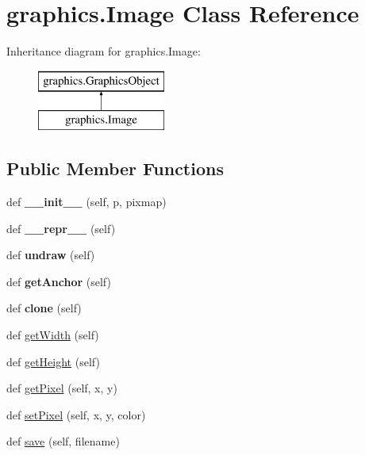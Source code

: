 \hypertarget{classgraphics_1_1_image}{}\section{graphics.\+Image Class Reference}
\label{classgraphics_1_1_image}
Inheritance diagram for graphics.\+Image\+:\begin{figure}[H]
\begin{center}
\leavevmode
\includegraphics[height=2.000000cm]{classgraphics_1_1_image}
\end{center}
\end{figure}
\subsection*{Public Member Functions}
\begin{DoxyCompactItemize}
\item 
def {\bfseries \+\_\+\+\_\+init\+\_\+\+\_\+} (self, p, pixmap)\hypertarget{classgraphics_1_1_image_a0e82c34ead99ecc7e8bd19f8d073c135}{}\label{classgraphics_1_1_image_a0e82c34ead99ecc7e8bd19f8d073c135}

\item 
def {\bfseries \+\_\+\+\_\+repr\+\_\+\+\_\+} (self)\hypertarget{classgraphics_1_1_image_a6dc7689939ebef91fbce7ff60b190a32}{}\label{classgraphics_1_1_image_a6dc7689939ebef91fbce7ff60b190a32}

\item 
def {\bfseries undraw} (self)\hypertarget{classgraphics_1_1_image_a012595b97cd10d26b7fa2f0f0460d169}{}\label{classgraphics_1_1_image_a012595b97cd10d26b7fa2f0f0460d169}

\item 
def {\bfseries get\+Anchor} (self)\hypertarget{classgraphics_1_1_image_a7f5afb0cad91db822c5074255eb53f04}{}\label{classgraphics_1_1_image_a7f5afb0cad91db822c5074255eb53f04}

\item 
def {\bfseries clone} (self)\hypertarget{classgraphics_1_1_image_a4ade7cc782c157e45fa9b516fe6a3a98}{}\label{classgraphics_1_1_image_a4ade7cc782c157e45fa9b516fe6a3a98}

\item 
def \hyperlink{classgraphics_1_1_image_aff8e62ceeb4265e4d17ce852903c9ae3}{get\+Width} (self)
\item 
def \hyperlink{classgraphics_1_1_image_ab092ccc35755f176309971023f912d67}{get\+Height} (self)
\item 
def \hyperlink{classgraphics_1_1_image_a69deca3f65e378be239eb1ba837d06f8}{get\+Pixel} (self, x, y)
\item 
def \hyperlink{classgraphics_1_1_image_a73fb3ce4de03fe9f57c076d739712378}{set\+Pixel} (self, x, y, color)
\item 
def \hyperlink{classgraphics_1_1_image_ace518e9286a3bc0f81c7f1029c394104}{save} (self, filename)
\end{DoxyCompactItemize}
